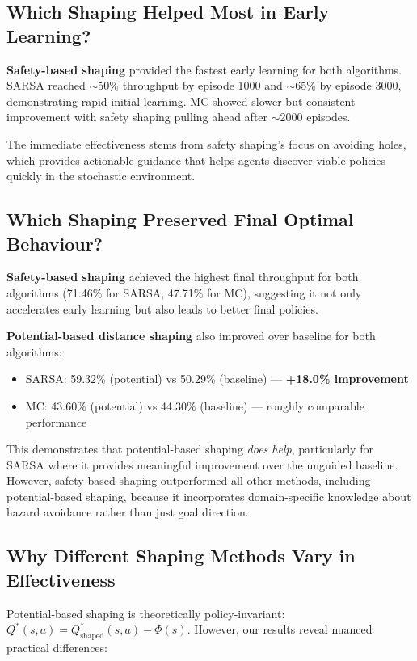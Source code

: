 \documentclass[11pt,a4paper]{article}
\begin{document}
\subsection{Which Shaping Helped Most in Early Learning?}

\textbf{Safety-based shaping} provided the fastest early learning for both algorithms. SARSA reached $\sim$50\% throughput by episode 1000 and $\sim$65\% by episode 3000, demonstrating rapid initial learning. MC showed slower but consistent improvement with safety shaping pulling ahead after $\sim$2000 episodes.

The immediate effectiveness stems from safety shaping's focus on avoiding holes, which provides actionable guidance that helps agents discover viable policies quickly in the stochastic environment.

\subsection{Which Shaping Preserved Final Optimal Behaviour?}

\textbf{Safety-based shaping} achieved the highest final throughput for both algorithms (71.46\% for SARSA, 47.71\% for MC), suggesting it not only accelerates early learning but also leads to better final policies.

\textbf{Potential-based distance shaping} also improved over baseline for both algorithms:
\begin{itemize}
    \item SARSA: 59.32\% (potential) vs 50.29\% (baseline) --- \textbf{+18.0\% improvement}
    \item MC: 43.60\% (potential) vs 44.30\% (baseline) --- roughly comparable performance
\end{itemize}

This demonstrates that potential-based shaping \emph{does help}, particularly for SARSA where it provides meaningful improvement over the unguided baseline. However, safety-based shaping outperformed all other methods, including potential-based shaping, because it incorporates domain-specific knowledge about hazard avoidance rather than just goal direction.

\subsection{Why Different Shaping Methods Vary in Effectiveness}

Potential-based shaping is theoretically policy-invariant: $Q^*(s,a) = Q_{\text{shaped}}^*(s,a) - \Phi(s)$. However, our results reveal nuanced practical differences:
\end{document}
